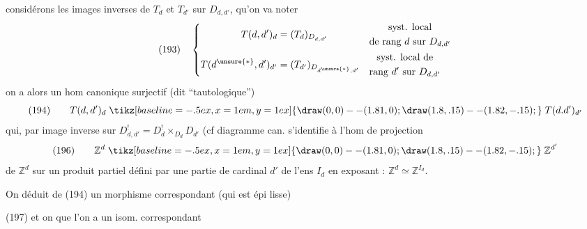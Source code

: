 considérons les images inverses de $T_d$ et $T_{d'}$ sur $D_{d,d'}$, qu'on va noter
\[
(193)\quad\left\{\begin{aligned}
T(d,d')_d&=(T_d)_{D_{d,d'}}&&\begin{gathered}\text{syst. local}\\\text{de rang }d\text{ sur }D_{d,d'}\end{gathered}\\
T(d^{\unsure{*}},d')_{d'}&=(T_{d'})_{D_{d^{\unsure{*}},d'}}&&\begin{gathered}\text{syst. local de}\\\text{rang }d'\text{ sur }D_{d,d'}\end{gathered}
\end{aligned}\right.
\]
on a alors un hom canonique surjectif (dit ``tautologique'')
\[
(194)\qquad T(d,d')_d\mathrel{\tikz[baseline=-.5ex,x=1em,y=1ex]{\draw (0,0)--(1.81,0);\draw (1.8,.15)--(1.82,-.15);}}T(d.d')_{d'}
\]
qui, par image inverse sur $D^!_{d,d'}=D^!_d\mathbin\times_{D_d}D_{d'}$ (cf diagramme can.
s'identifie à l'hom de projection
\[
(196)\qquad\mathbb Z^d\mathrel{\tikz[baseline=-.5ex,x=1em,y=1ex]{\draw (0,0)--(1.81,0);\draw (1.8,.15)--(1.82,-.15);}}\mathbb Z^{d'}
\]
de $\mathbb Z^d$ sur un produit partiel défini par une partie de cardinal $d'$ de l'ens $I_d$ en exposant : $\mathbb Z^d\simeq\mathbb Z^{I_d}$.

On déduit de (194) un morphisme correspondant (qui est épi lisse)

(197)\quad
{}
et on  que l'on a un isom. correspondant

